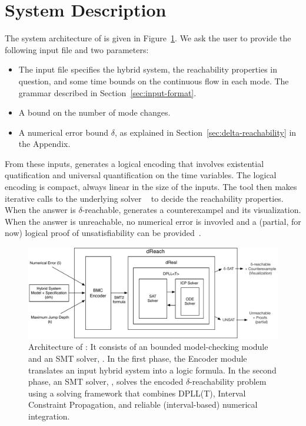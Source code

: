 \section{System Description}\label{sec:system}
The system architecture of \dReach{} is given in Figure~\ref{sec:system}. We ask the user to provide the following input file and two parameters:
\begin{itemize}
\item The input file specifies the hybrid system, the reachability
  properties in question, and some time bounds on the continuous flow in each mode.
  The grammar described in
  Section~\ref{sec:input-format}.
\item A bound on the number of mode changes.
\item A numerical error bound $\delta$, as explained in Section~\ref{sec:delta-reachability} in the Appendix.
\end{itemize}
From these inputs, \dReach{} generates a logical encoding that involves existential quatification and universal quantification on the time variables. The logical encoding is compact, always linear in the size of the inputs. The tool then makes iterative calls to the underlying solver \dReal{}~\cite{DBLP:conf/cade/GaoKC13} to decide the reachability properties. When the answer is {\sf $\delta$-reachable}, \dReach{} generates a counterexampel and its visualization. When the answer is {\sf unreachable}, no numerical error is invovled and a (partial, for now) logical proof of unsatisfiability can be provided~\cite{SYNASC14}.
\begin{figure}[!h]
  \centering
  \includegraphics[width=\textwidth]{images/dreach_archi}
  \caption{Architecture of \dReach{}: It consists of an bounded
    model-checking module and an SMT solver, \dReal{}. In the first
    phase, the Encoder module translates an input hybrid system into a
    logic formula. In the second phase, an
    SMT solver, \dReal{}, solves the encoded $\delta$-reachability
    problem using a solving framework that combines DPLL(T), Interval Constraint Propagation, and reliable (interval-based) numerical integration.
  }\label{fig:system-description}
\end{figure}



